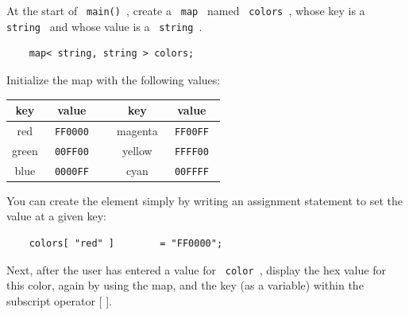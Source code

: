\documentclass[a4paper,12pt]{book}
\begin{document}
                    At the start of \texttt{ main() }, create a
                    \texttt{ map } named \texttt{ colors },
                    whose key is a \texttt{ string }
                    and whose value is a \texttt{ string }.

\begin{verbatim}
    map< string, string > colors;
\end{verbatim}

                    Initialize the map with the following values:

                    \begin{center}
                        \begin{tabular}{ | c | c | c | c | c | }
                            \hline{}
                                \textbf{ key } &
                                \textbf{ value } & &
                                \textbf{ key } & 
                                \textbf{ value }

                            \\ \hline
                            
                            red & \texttt{ FF0000 } & & magenta & \texttt{ FF00FF }
                            \\ \hline
                            green & \texttt{ 00FF00 } & & yellow & \texttt{ FFFF00 }
                            \\ \hline
                            blue & \texttt{ 0000FF } & & cyan & \texttt{ 00FFFF }
                             \\ \hline
                            
                        \end{tabular}
                    \end{center}

                    You can create the element simply by writing an
                    assignment statement to set the value at a given key:

\begin{verbatim}
    colors[ "red" ]        = "FF0000";
\end{verbatim}

                    Next, after the user has entered a value for
                    \texttt{ color }, display the hex value for this
                    color, again by using the map, and the key
                    (as a variable) within the subscript operator $ [ $ $ ] $.
\end{document}
